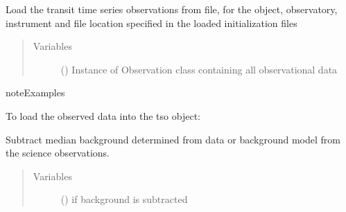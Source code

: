 \documentclass[a4paper,10pt,english]{sphinxmanual}
\begin{document}
\begin{fulllineitems}
\begin{fulllineitems}
\end{fulllineitems}


\begin{fulllineitems}
\label{\detokenize{cascade.TSO:cascade.TSO.TSO.TSOSuite.load_data}}
Load the transit time series observations from file, for the
object, observatory, instrument and file location specified in the
loaded initialization files
\begin{quote}\begin{description}
\item[{Variables}] \leavevmode
{} () \textendash{} Instance of Observation class containing all observational data

\end{description}\end{quote}

\begin{sphinxadmonition}{note}{Examples}

To load the observed data into the tso object:

%
\begin{sphinxVerbatim}[commandchars=\\\{\}]
\end{sphinxVerbatim}
\end{sphinxadmonition}

\end{fulllineitems}


\begin{fulllineitems}
\label{\detokenize{cascade.TSO:cascade.TSO.TSO.TSOSuite.subtract_background}}
Subtract median background determined from data or background model
from the science observations.
\begin{quote}\begin{description}
\item[{Variables}] \leavevmode
{} () \textendash{}  if background is subtracted


\end{description}
\end{quote}
\end{fulllineitems}
\end{fulllineitems}
\end{document}
